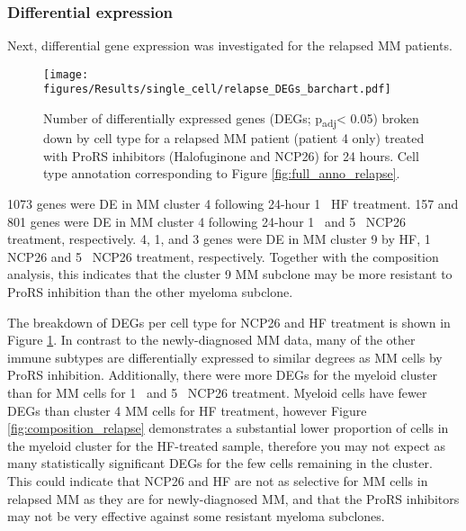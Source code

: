 \subsubsection{Differential expression}
Next, differential gene expression was investigated for the relapsed MM patients.
%
\begin{figure}[htb]
\centering
\texttt{[image: figures/Results/single\_cell/relapse\_DEGs\_barchart.pdf]}
\caption[scRNA-seq DEGs per cell type- relapsed MM]{Number of differentially expressed genes (DEGs; p\textsubscript{adj}< 0.05) broken down by cell type for a relapsed MM patient (patient 4 only) treated with ProRS inhibitors (Halofuginone and NCP26) for 24 hours.
Cell type annotation corresponding to Figure \ref{fig:full_anno_relapse}.}
\label{fig:relapse_deg_bar}
\end{figure}
%
1073 genes were DE in MM cluster 4 following 24-hour 1\si{\micro\Molar} HF treatment.
157 and 801 genes were DE in MM cluster 4 following 24-hour 1\si{\micro\Molar}  and 5\si{\micro\Molar} NCP26 treatment, respectively.
4, 1, and 3 genes were DE in MM cluster 9 by HF, 1\si{\micro\Molar} NCP26  and 5\si{\micro\Molar} NCP26 treatment, respectively.
Together with the composition analysis, this indicates that the cluster 9 MM subclone may be more resistant to ProRS inhibition than the other myeloma subclone.

The breakdown of DEGs per cell type for NCP26 and HF treatment is shown in Figure \ref{fig:relapse_deg_bar}.
In contrast to the newly-diagnosed MM data, many of the other immune subtypes are differentially expressed to similar degrees as MM cells by ProRS inhibition.
Additionally, there were more DEGs for the myeloid cluster than for MM cells for 1\si{\micro\Molar} and 5\si{\micro\Molar}  NCP26 treatment.
Myeloid cells have fewer DEGs than cluster 4 MM cells for HF treatment, however Figure \ref{fig:composition_relapse} demonstrates a substantial lower proportion of cells in the myeloid cluster for the HF-treated sample, therefore you may not expect as many statistically significant DEGs for the few cells remaining in the cluster.
This could indicate that NCP26 and HF are not as selective for MM cells in relapsed MM as they are for newly-diagnosed MM, and that the ProRS inhibitors may not be very effective against some resistant myeloma subclones.

